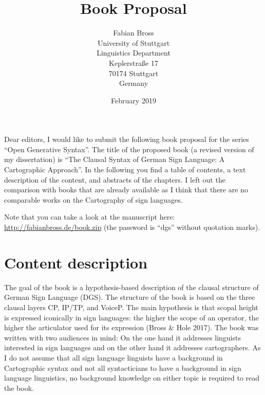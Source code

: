 \documentclass[a4paper,DIV=calc,11pt]{scrartcl}
\begin{document}
	
	
\title{Book Proposal}
\author{Fabian Bross \\ University of Stuttgart \\ Linguistics Department \\ Keplerstraße 17 \\ 70174 Stuttgart \\ Germany}
\date{\small February 2019}
\maketitle %

\noindent Dear editors, I would like to submit the following book proposal for the series ``Open Generative Syntax''. The title of the proposed book (a revised version of my dissertation) is ``The Clausal Syntax of German Sign Language: A Cartographic Approach''. In the following you find a table of contents, a text description of the content, and abstracts of the chapters. I left out the comparison with books that are already available as I think that there are no comparable works on the Cartography of sign languages.

Note that you can take a look at the manuscript here: \url{http://fabianbross.de/book.zip} (the password is ``dgs'' without quotation marks). 





\section*{Content description}
\noindent The goal of the book is a hypothesis-based description of the clausal structure of German Sign Language (DGS). The structure of the book is based on the three clausal layers CP, IP/TP, and VoiceP. The main hypothesis is that scopal height is expressed iconically in sign languages: the higher the scope of an operator, the higher the articulator used for its expression (Bross \& Hole 2017). The book was written with two audiences in mind: On the one hand it addresses linguists interested in sign languages and on the other hand it addresses cartographers. As I do not assume that all sign language linguists have a background in Cartographic syntax and not all syntacticians to have a background in sign language linguistics, no background knowledge on either topic is required to read the book.
\end{document}
